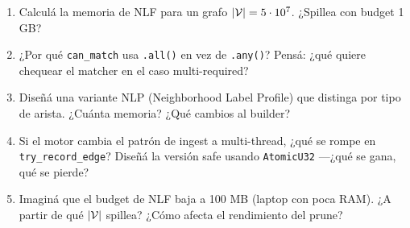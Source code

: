 \begin{ejercicios}
\begin{enumerate}
    \item \starred{} Calculá la memoria de NLF para un grafo
    \(|\mathcal{V}| = 5 \cdot 10^7\). ¿Spillea con budget 1 GB?

    \item ¿Por qué \texttt{can\_match} usa \texttt{.all()} en vez
    de \texttt{.any()}? Pensá: ¿qué quiere chequear el matcher en
    el caso multi-required?

    \item \starred{} Diseñá una variante NLP (Neighborhood Label
    Profile) que distinga por tipo de arista. ¿Cuánta memoria? ¿Qué
    cambios al builder?

    \item Si el motor cambia el patrón de ingest a multi-thread,
    ¿qué se rompe en \texttt{try\_record\_edge}? Diseñá la versión
    safe usando \texttt{AtomicU32} ---¿qué se gana, qué se pierde?

    \item Imaginá que el budget de NLF baja a 100 MB (laptop con
    poca RAM). ¿A partir de qué $|\mathcal{V}|$ spillea? ¿Cómo afecta el
    rendimiento del prune?
\end{enumerate}
\end{ejercicios}
